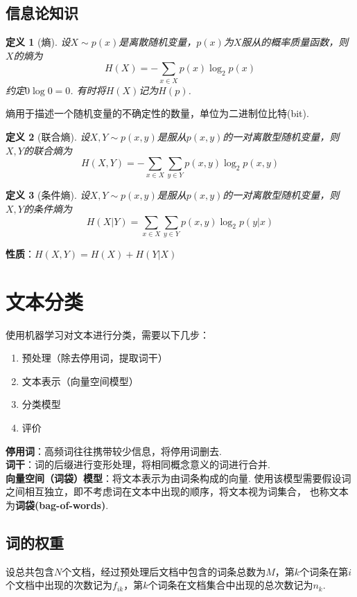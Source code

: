 \documentclass[12pt, a4paper, oneside]{ctexart}
\newtheorem{definition}{定义}
\numberwithin{equation}{section}  %
\begin{document}
\subsection{信息论知识}
\begin{definition}[熵]
    设$X\sim p(x)$是离散随机变量，$p(x)$为$X$服从的概率质量函数，则$X$的熵为
    \begin{equation*}
    H(X) = -\sum_{x\in X}p(x)\log_2p(x)   
    \end{equation*}
    约定$0\log 0 = 0$. 有时将$H(X)$记为$H(p)$.
\end{definition}
熵用于描述一个随机变量的不确定性的数量，单位为二进制位比特(bit).
\begin{definition}[联合熵]
    设$X,Y\sim p(x,y)$是服从$p(x,y)$的一对离散型随机变量，则$X,Y$的联合熵为
    \begin{equation*}
        H(X,Y) = -\sum_{x\in X}\sum_{y\in Y}p(x,y)\log_2 p(x,y)
    \end{equation*}
\end{definition}
\begin{definition}[条件熵]
    设$X,Y\sim p(x,y)$是服从$p(x,y)$的一对离散型随机变量，则$X,Y$的条件熵为
    \begin{equation*}
        H(X|Y) = \sum_{x\in X}\sum_{y\in Y}p(x,y)\log_2 p(y|x)
    \end{equation*}
\end{definition}
\textbf{性质}：$H(X,Y) = H(X)+H(Y|X)$
\section{文本分类}
使用机器学习对文本进行分类，需要以下几步：
\begin{enumerate}
    \item 预处理（除去停用词，提取词干）
    \item 文本表示（向量空间模型）
    \item 分类模型
    \item 评价
\end{enumerate}
\noindent\textbf{停用词}：高频词往往携带较少信息，将停用词删去.\\
\textbf{词干}：词的后缀进行变形处理，将相同概念意义的词进行合并.\\
\textbf{向量空间（词袋）模型}：将文本表示为由词条构成的向量. 使用该模型需要假设词之间相互独立，即不考虑词在文本中出现的顺序，将文本视为词集合，
也称文本为\textbf{词袋(bag-of-words)}.

\subsection{词的权重}
设总共包含$N$个文档，经过预处理后文档中包含的词条总数为$M$，第$k$个词条在第$i$个文档中出现的次数记为$f_{ik}$，第$k$个词条在文档集合中出现的总次数记为$n_k$.
\end{document}
